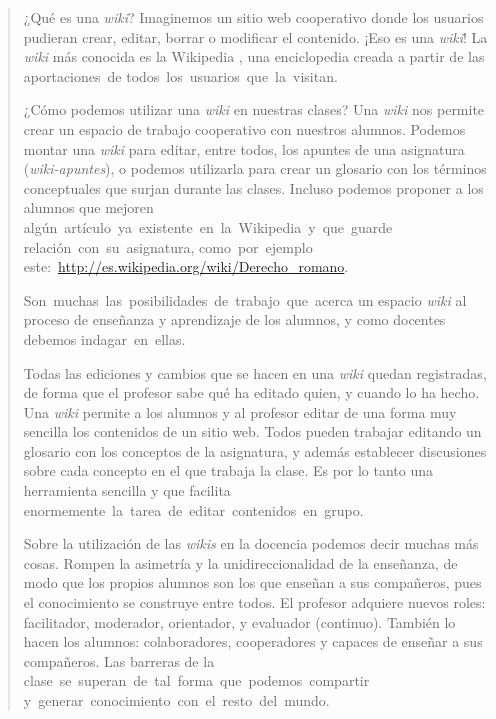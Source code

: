 \begin{quotation}
\small{¿Qué es una \textit{wiki}? Imaginemos un sitio web cooperativo donde los usuarios pudieran crear, editar, borrar o modificar el contenido. ¡Eso es una \textit{wiki}! La \textit{wiki} más conocida es la Wikipedia \cite{web:wikipedia}, una enciclopedia creada a partir de las aportaciones de todos los usuarios que la visitan.

¿Cómo podemos utilizar una \textit{wiki} en nuestras clases? Una \textit{wiki} nos permite crear un espacio de trabajo cooperativo con nuestros alumnos. Podemos montar una \textit{wiki} para editar, entre todos, los apuntes de una asignatura (\textit{wiki-apuntes}), o podemos utilizarla para crear un glosario con los términos conceptuales que surjan durante las clases. Incluso podemos proponer a los alumnos que mejoren algún artículo ya existente en la Wikipedia y que guarde relación con su asignatura, como por ejemplo este: \url{http://es.wikipedia.org/wiki/Derecho_romano}.

Son muchas las posibilidades de trabajo que acerca un espacio \textit{wiki} al proceso de enseñanza y aprendizaje de los alumnos, y como docentes debemos indagar en ellas.

Todas las ediciones y cambios que se hacen en una \textit{wiki} quedan registradas, de forma que el profesor sabe qué ha editado quien, y cuando lo ha hecho. Una \textit{wiki} permite a los alumnos y al profesor editar de una forma muy sencilla los contenidos de un sitio web. Todos pueden trabajar editando un glosario con los conceptos de la asignatura, y además establecer discusiones sobre cada concepto en el que trabaja la clase. Es por lo tanto una herramienta sencilla y que facilita enormemente la tarea de editar contenidos en grupo.

Sobre la utilización de las \textit{wikis} en la docencia podemos decir muchas más cosas. Rompen la asimetría y la unidireccionalidad de la enseñanza, de modo que los propios alumnos son los que enseñan a sus compañeros, pues el conocimiento se construye entre todos. El profesor adquiere nuevos roles: facilitador, moderador, orientador, y evaluador (continuo). También lo hacen los alumnos: colaboradores, cooperadores y capaces de enseñar a sus compañeros. Las barreras de la clase se superan de tal forma que podemos compartir y generar conocimiento con el resto del mundo.}
\end{quotation}

